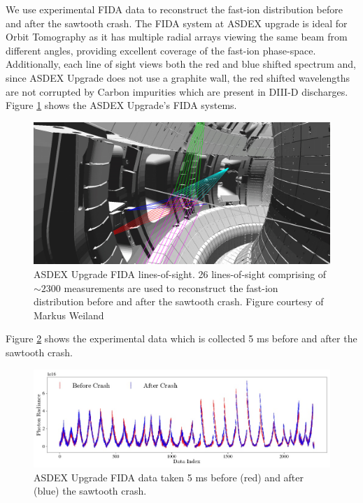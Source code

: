 We use experimental FIDA data to reconstruct the fast-ion distribution before and after the sawtooth crash. The FIDA system at ASDEX upgrade is ideal for Orbit Tomography as it has multiple radial arrays viewing the same beam from different angles, providing excellent coverage of the fast-ion phase-space. Additionally, each line of sight views both the red and blue shifted spectrum and, since ASDEX Upgrade does not use a graphite wall, the red shifted wavelengths are not corrupted by Carbon impurities which are present in DIII-D discharges. Figure \ref{fig:augd_chords} shows the ASDEX Upgrade's FIDA systems.
\begin{figure}[h!]
    \centering
    \includegraphics[width=16cm]{figures/augd_chords.jpg}
    \caption{ASDEX Upgrade FIDA lines-of-sight. 26 lines-of-sight comprising of $\sim2300$ measurements are used to reconstruct the fast-ion distribution before and after the sawtooth crash. Figure courtesy of Markus Weiland\cite{weiland2016}}
    \label{fig:augd_chords}
\end{figure}
Figure \ref{fig:augd_data} shows the experimental data which is collected 5 ms before and after the sawtooth crash. 
\begin{figure}[h!]
    \centering
    \includegraphics[width=16cm]{figures/sawtooth_data.jpg}
    \caption{ASDEX Upgrade FIDA data taken 5 ms before (red) and after (blue) the sawtooth crash.}
    \label{fig:augd_data}
\end{figure}

